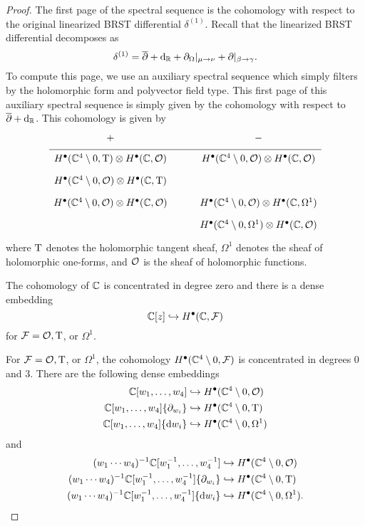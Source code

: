 \begin{proof}
The first page of the spectral sequence is the cohomology with respect to the original linearized BRST differential $\delta^{(1)}$. 
Recall that the linearized BRST differential decomposes as
\[
\delta^{(1)} = \overline{\partial} + {\rm d}_{\mathbb R} + \partial_{\Omega} |_{\mu \to \nu} + \partial |_{\beta \to \gamma}  .
\]
To compute this page, we use an auxiliary spectral sequence which simply filters by the holomorphic form and polyvector field type. 
This first page of this auxiliary spectral sequence is simply given by the cohomology with respect to $\overline{\partial} + {\rm d}_{\mathbb R}$. 
This cohomology is given by
\begin{equation}
  \label{eqn:ads4ss} 
  \begin{tikzcd}[row sep = 1 ex]
    + & - \\ \hline
H^\bu(\CC^4\setminus 0, \T) \otimes H^\bu(\CC, \cO) & H^\bu(\CC^4 \setminus 0, \cO) \otimes H^\bu(\CC, \cO) \\
H^\bu(\CC^4\setminus 0, \cO) \otimes H^\bu(\CC, \T) \\
H^\bu(\CC^4\setminus 0, \cO) \otimes H^\bu(\CC, \cO) & H^\bu(\CC^4\setminus 0, \cO) \otimes H^\bu(\CC, \Omega^1) \\ & H^\bu(\CC^4\setminus 0, \Omega^1) \otimes H^\bu(\CC, \cO)  
\end{tikzcd}
\end{equation}
where ${\rm T}$ denotes the holomorphic tangent sheaf, $\Omega^1$ denotes the sheaf of holomorphic one-forms, and $\mathcal O$ is the sheaf of holomorphic functions.

The cohomology of $\mathbb C$ is concentrated in degree zero and there is a dense embedding
\[
\mathbb C[z] \hookrightarrow H^\bullet(\mathbb C, \mathcal F) 
\]
for $\mathcal F = \mathcal O, {\rm T}$, or $\Omega^1$. 

For $\mathcal F = \mathcal O, {\rm T}$, or $\Omega^1$, the cohomology $H^\bullet(\mathbb C^4 \setminus 0, \mathcal F)$ is concentrated in degrees $0$ and $3$. 
There are the following dense embeddings 
\begin{align*}
\mathbb C[w_1,\ldots, w_4] & \hookrightarrow H^\bullet(\mathbb C^4 \setminus 0, \mathcal O) \\ 
\mathbb C[w_1,\ldots, w_4] \{\partial_{w_i}\} & \hookrightarrow H^\bullet(\mathbb C^4 \setminus 0, {\rm T}) \\
\mathbb C[w_1,\ldots, w_4] \{{\rm d} w_i\} & \hookrightarrow H^\bullet(\mathbb C^4 \setminus 0, \Omega^1) 
\end{align*}
and
\begin{align*}
(w_1\cdots w_4)^{-1} \mathbb C[w_1^{-1},\ldots, w_4^{-1}] & \hookrightarrow H^\bullet(\mathbb C^4 \setminus 0, \mathcal O) \\ 
(w_1\cdots w_4)^{-1} \mathbb C[w_1^{-1},\ldots, w_4^{-1}] \{\partial_{w_i}\} & \hookrightarrow H^\bullet(\mathbb C^4 \setminus 0, {\rm T}) \\
(w_1\cdots w_4)^{-1} \mathbb C[w_1^{-1},\ldots, w_4^{-1}] \{{\rm d} w_i\} & \hookrightarrow H^\bullet(\mathbb C^4 \setminus 0, \Omega^1) .
\end{align*}


\end{proof}
